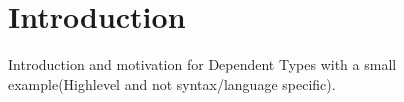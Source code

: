 \section{Introduction}
Introduction and motivation for Dependent Types with a small example(Highlevel and not syntax/language specific).